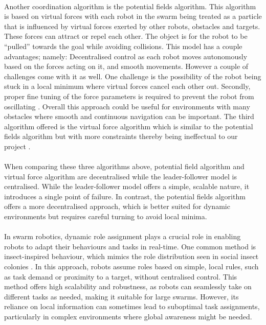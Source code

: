 \paragraph*{}
Another coordination algorithm is the potential fields algorithm. This algorithm is based on virtual forces with each robot in the swarm being treated as a particle that is influenced by virtual forces exerted by other robots, obstacles and targets. These forces can attract or repel each other. The object is for the robot to be “pulled” towards the goal while avoiding collisions. This model has a couple advantages; namely: Decentralised control as each robot moves autonomously based on the forces acting on it, and smooth movements. However a couple of challenges come with it as well. One challenge is the possibility of the robot being stuck in a local minimum where virtual forces cancel each other out. Secondly, proper fine tuning of the force parameters is required to prevent the robot from oscillating \cite{martinez2023swarm}. Overall this approach could be useful for environments with many obstacles where smooth and continuous navigation can be important.  The third algorithm offered is the virtual force algorithm which is similar to the potential fields algorithm but with more constraints thereby being ineffectual to our project \cite{udugama2023evolution}. 

\paragraph*{}
When comparing these three algorithms above, potential field algorithm and virtual force algorithm are decentralised while the leader-follower model is centralised. While the leader-follower model offers a simple, scalable nature, it introduces a single point of failure. In contrast, the potential fields algorithm offers a more decentralised approach, which is better suited for dynamic environments but requires careful turning to avoid local minima.

\paragraph*{}
In swarm robotics, dynamic role assignment plays a crucial role in enabling robots to adapt their behaviours and tasks in real-time. One common method is insect-inspired behaviour, which mimics the role distribution seen in social insect colonies \cite{bonabeau1997adaptive}. In this approach, robots assume roles based on simple, local rules, such as task demand or proximity to a target, without centralised control. This method offers high scalability and robustness, as robots can seamlessly take on different tasks as needed, making it suitable for large swarms. However, its reliance on local information can sometimes lead to suboptimal task assignments, particularly in complex environments where global awareness might be needed.

